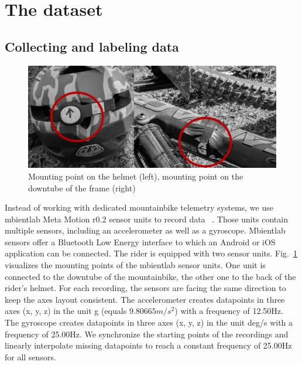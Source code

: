 \documentclass[runningheads]{llncs}
\begin{document}
\section{The dataset}

\subsection{Collecting and labeling data}

\begin{figure}
\includegraphics[width=\textwidth]{mountingpoints.jpg}
\caption{Mounting point on the helmet (left), mounting point on the downtube of the frame (right)}
\label{fig1}	
\end{figure}

Instead of working with dedicated mountainbike telemetry systems, we use mbientlab Meta Motion r0.2 sensor units to record data ~\cite{mbientlab}.
Those units contain multiple sensors, including an accelerometer as well as a gyroscope.
Mbientlab sensors offer a Bluetooth Low Energy interface to which an Android or iOS application can be connected.
The rider is equipped with two sensor units.
Fig.~\ref{fig1} visualizes the mounting points of the mbientlab sensor units.
One unit is connected to the downtube of the mountainbike, the other one to the back of the rider's helmet.
For each recording, the sensors are facing the same direction to keep the axes layout consistent.
The accelerometer creates datapoints in three axes (x, y, z) in the unit g (equals $9.80665 m/s^2$) with a frequency of 12.50Hz.
The gyroscope creates datapoints in three axes (x, y, z) in the unit deg/s with a frequency of 25.00Hz.
We synchronize the starting points of the recordings and linearly interpolate missing datapoints to reach a constant frequency of 25.00Hz for all sensors.
\end{document}

